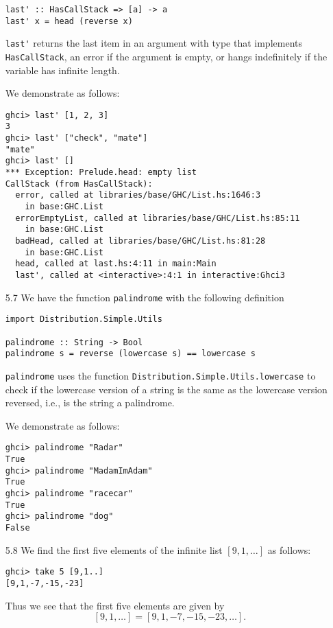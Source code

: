 \documentclass{article}
\begin{document}
\begin{itemize}
\begin{verbatim}
last' :: HasCallStack => [a] -> a 
last' x = head (reverse x)
        \end{verbatim}
        \verb|last'| returns the last item in an argument with type that implements 
        \verb|HasCallStack|, an error if the argument is empty, or hangs indefinitely
        if the variable has infinite length.\par
        \qquad We demonstrate as follows:
        \begin{verbatim}
ghci> last' [1, 2, 3]
3
ghci> last' ["check", "mate"]
"mate"
ghci> last' []
*** Exception: Prelude.head: empty list
CallStack (from HasCallStack):
  error, called at libraries/base/GHC/List.hs:1646:3 
    in base:GHC.List
  errorEmptyList, called at libraries/base/GHC/List.hs:85:11 
    in base:GHC.List
  badHead, called at libraries/base/GHC/List.hs:81:28 
    in base:GHC.List
  head, called at last.hs:4:11 in main:Main
  last', called at <interactive>:4:1 in interactive:Ghci3
        \end{verbatim}
        \item[5.7] We have the function \verb|palindrome| with the following 
        definition 
        \begin{verbatim}
import Distribution.Simple.Utils

palindrome :: String -> Bool
palindrome s = reverse (lowercase s) == lowercase s 
        \end{verbatim}
        \verb|palindrome| uses the function 
        \verb|Distribution.Simple.Utils.lowercase| to check if the lowercase version 
        of a string is the same as the lowercase version reversed, i.e., is the 
        string a palindrome.\par
        \qquad We demonstrate as follows:
        \begin{verbatim}
ghci> palindrome "Radar"
True
ghci> palindrome "MadamImAdam"
True
ghci> palindrome "racecar"
True
ghci> palindrome "dog"
False
        \end{verbatim}
        \item[5.8] We find the first five elements of the infinite list 
        $[9, 1, \ldots]$ as follows:
        \begin{verbatim}
ghci> take 5 [9,1..]
[9,1,-7,-15,-23]
        \end{verbatim}
        Thus we see that the first five elements are given by
        \[
            [9, 1, \ldots] = [9, 1, -7, -15, -23, \ldots].
        \]
    \end{itemize}
\end{document}
